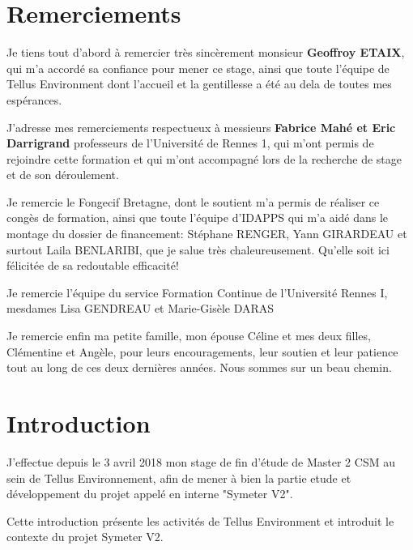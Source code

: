 \documentclass[12pt,a4paper]{report}
\begin{document}
\chapter*{Remerciements}%
\thispagestyle{empty}%

\para Je tiens tout d'abord à remercier très sincèrement monsieur \textbf{Geoffroy ETAIX}, qui m'a accordé sa confiance pour mener ce stage, ainsi que toute l'équipe de Tellus Environment dont l'accueil et la gentillesse a été au dela de toutes mes espérances.

\para J'adresse mes remerciements respectueux à messieurs \textbf{Fabrice Mahé et Eric Darrigrand} professeurs de l'Université de Rennes 1, qui m'ont permis de rejoindre cette formation et qui m'ont accompagné lors de la recherche de stage et de son  déroulement.

\para Je remercie le Fongecif Bretagne, dont le soutient m'a permis de réaliser ce congès de formation, ainsi que toute l'équipe d'IDAPPS qui m'a aidé dans le montage du dossier de financement: Stéphane RENGER, Yann GIRARDEAU et surtout Laila BENLARIBI, que je salue très chaleureusement. Qu'elle soit ici félicitée de sa redoutable efficacité! 

\para Je remercie l'équipe du service Formation Continue de l'Université Rennes I, mesdames Lisa GENDREAU et Marie-Gisèle DARAS

\para Je remercie enfin ma petite famille, mon épouse Céline et mes deux filles, Clémentine et Angèle, pour leurs encouragements, leur soutien et leur patience tout au long de ces deux dernières années. Nous sommes sur un beau chemin.


\setcounter{tocdepth}{5}
\tableofcontents
\newpage

\chapter{Introduction}

J'effectue depuis le 3 avril 2018 mon stage de fin d'étude de Master 2 CSM au sein de Tellus Environnement, afin de mener à bien la partie etude et développement du projet appelé en interne "Symeter V2".

\para Cette introduction présente les activités de Tellus Environment et introduit le contexte du projet Symeter V2.
\end{document}

